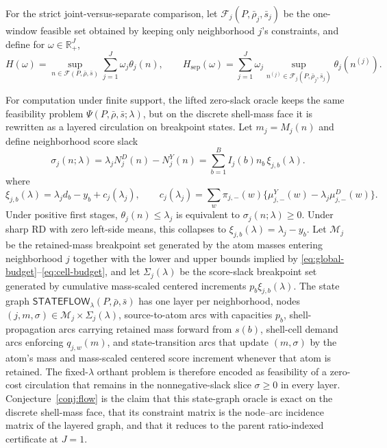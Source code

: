 \documentclass[11pt]{article}
\newcommand{\R}{\mathbb{R}}
\theoremstyle{definition}
\theoremstyle{plain}
\theoremstyle{remark}
\begin{document}
For the strict joint-versus-separate comparison, let \(\mathcal F_j(P,\bar\rho_j,\bar s_j)\)
be the one-window feasible set obtained by keeping only neighborhood \(j\)'s constraints, and
define for \(\omega\in\R_+^J\),
\[
  H(\omega)=\sup_{n\in\mathcal F(P,\bar\rho,\bar s)} \sum_{j=1}^J \omega_j \theta_j(n),
  \qquad
  H_{\mathrm{sep}}(\omega)=
  \sum_{j=1}^J \omega_j \sup_{n^{(j)}\in \mathcal F_j(P,\bar\rho_j,\bar s_j)} \theta_j(n^{(j)}).
\]

For computation under finite support, the lifted zero-slack oracle keeps the same feasibility
problem \(\Psi(P,\bar\rho,\bar s;\lambda)\), but on the discrete shell-mass face it is rewritten
as a layered circulation on breakpoint states. Let \(m_j=M_j(n)\) and define neighborhood score
slack
\[
  \sigma_j(n;\lambda)=\lambda_j N_j^D(n)-N_j^Y(n)
  =
  \sum_{b=1}^B I_j(b)n_b\,\xi_{j,b}(\lambda).
\]
where
\[
  \xi_{j,b}(\lambda)
  =
  \lambda_j d_b-y_b+c_j(\lambda_j),
  \qquad
  c_j(\lambda_j)
  =
  \sum_w \pi_{j,-}(w)\{\mu^Y_{j,-}(w)-\lambda_j\mu^D_{j,-}(w)\}.
\]
Under positive first stages, \(\theta_j(n)\le \lambda_j\) is equivalent to
\(\sigma_j(n;\lambda)\ge 0\). Under sharp RD with zero left-side means, this collapses to
\(\xi_{j,b}(\lambda)=\lambda_j-y_b\). Let
\(\mathcal M_j\) be the retained-mass breakpoint set generated by the atom masses entering
neighborhood \(j\) together with the lower and upper bounds implied by
\eqref{eq:global-budget}--\eqref{eq:cell-budget}, and let \(\Sigma_j(\lambda)\) be the score-slack
breakpoint set generated by cumulative mass-scaled centered increments
\(p_b\xi_{j,b}(\lambda)\). The state graph
\(\mathsf{STATEFLOW}_\lambda(P,\bar\rho,\bar s)\) has one layer per neighborhood, nodes
\((j,m,\sigma)\in\mathcal M_j\times\Sigma_j(\lambda)\), source-to-atom arcs with capacities
\(p_b\), shell-propagation arcs carrying retained mass forward from \(s(b)\), shell-cell demand
arcs enforcing \(q_{j,w}(m)\), and state-transition arcs that update \((m,\sigma)\) by the atom's
mass and mass-scaled centered score increment whenever that atom is retained. The fixed-\(\lambda\) orthant
problem is therefore encoded as feasibility of a zero-cost circulation that remains in the
nonnegative-slack slice \(\sigma\ge 0\) in every layer. Conjecture~\ref{conj:flow} is the claim
that this state-graph oracle is exact on the discrete shell-mass face, that its constraint matrix
is the node--arc incidence matrix of the layered graph, and that it reduces to the parent
ratio-indexed certificate at \(J=1\).
\end{document}
